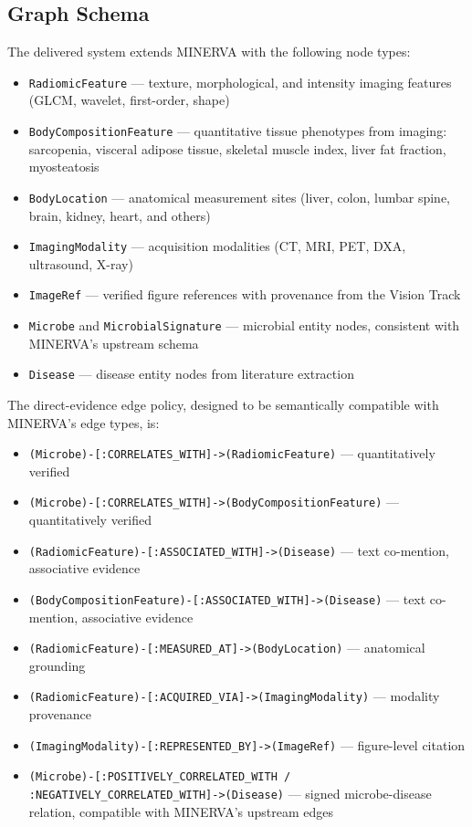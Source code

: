 \documentclass[12pt, letterpaper]{article}
\begin{document}
\subsection{Graph Schema}

The delivered system extends MINERVA with the following node types:

\begin{itemize}
    \item \texttt{RadiomicFeature} — texture, morphological, and intensity imaging features (GLCM, wavelet, first-order, shape)
    \item \texttt{BodyCompositionFeature} — quantitative tissue phenotypes from imaging: sarcopenia, visceral adipose tissue, skeletal muscle index, liver fat fraction, myosteatosis
    \item \texttt{BodyLocation} — anatomical measurement sites (liver, colon, lumbar spine, brain, kidney, heart, and others)
    \item \texttt{ImagingModality} — acquisition modalities (CT, MRI, PET, DXA, ultrasound, X-ray)
    \item \texttt{ImageRef} — verified figure references with provenance from the Vision Track
    \item \texttt{Microbe} and \texttt{MicrobialSignature} — microbial entity nodes, consistent with MINERVA's upstream schema
    \item \texttt{Disease} — disease entity nodes from literature extraction
\end{itemize}

The direct-evidence edge policy, designed to be semantically compatible with MINERVA's edge types, is:

\begin{itemize}
    \item \texttt{(Microbe)-[:CORRELATES\_WITH]->(RadiomicFeature)} — quantitatively verified
    \item \texttt{(Microbe)-[:CORRELATES\_WITH]->(BodyCompositionFeature)} — quantitatively verified
    \item \texttt{(RadiomicFeature)-[:ASSOCIATED\_WITH]->(Disease)} — text co-mention, associative evidence
    \item \texttt{(BodyCompositionFeature)-[:ASSOCIATED\_WITH]->(Disease)} — text co-mention, associative evidence
    \item \texttt{(RadiomicFeature)-[:MEASURED\_AT]->(BodyLocation)} — anatomical grounding
    \item \texttt{(RadiomicFeature)-[:ACQUIRED\_VIA]->(ImagingModality)} — modality provenance
    \item \texttt{(ImagingModality)-[:REPRESENTED\_BY]->(ImageRef)} — figure-level citation
    \item \texttt{(Microbe)-[:POSITIVELY\_CORRELATED\_WITH / :NEGATIVELY\_CORRELATED\_WITH]->(Disease)} — signed microbe-disease relation, compatible with MINERVA's upstream edges
\end{itemize}
\end{document}
